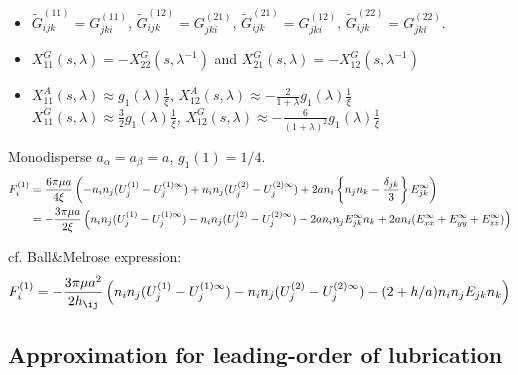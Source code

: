 \documentclass[11pt]{scrartcl}
\begin{document}
\begin{itemize}
 \item $\tilde{G}_{ijk}^{(11)}=G_{jki}^{(11)}$,
$\tilde{G}_{ijk}^{(12)}=G_{jki}^{(21)}$,
$\tilde{G}_{ijk}^{(21)}=G_{jki}^{(12)}$,
$\tilde{G}_{ijk}^{(22)}=G_{jki}^{(22)}$.

 \item 
$X_{11}^{G}(s,\lambda)
= - X_{22}^{G} (s, \lambda^{-1})$
and $X_{21}^{G}(s,\lambda)
= - X_{12}^{G} (s, \lambda^{-1})$

 \item 
$X_{11}^{A}(s,\lambda)\approx g_1(\lambda) \frac{1}{\xi}$, 
$X_{12}^{A}(s,\lambda) \approx -\frac{2}{1+\lambda}g_1(\lambda) \frac{1}{\xi}$\\
$X_{11}^{G}(s,\lambda)\approx \frac{3}{2} g_1(\lambda) \frac{1}{\xi}$,
$X_{12}^{G}(s,\lambda)\approx -\frac{6}{(1+\lambda)^2} g_1(\lambda) \frac{1}{\xi}$   
\end{itemize}
Monodisperse $a_\alpha = a_{\beta}=a$, $g_1(1)=1/4$.
\begin{align}
 F^{(1)}_i
&= 
\frac{6 \pi\mu a}{4\xi}
\left(
-   n_i n_j
(U_{j}^{(1)}-U_{j}^{(1)\infty})
+   n_i n_j
(U_{j}^{(2)}-U_{j}^{(2)\infty})
+  
2a n_i\left\{n_j n_k - \frac{\delta_{jk}}{3} \right\} E^{\infty}_{jk}
\right) \notag \\
&= 
-
\frac{3 \pi\mu a}{2\xi}
\left(
   n_i n_j
(U_{j}^{(1)}-U_{j}^{(1)\infty})
-   n_i n_j
(U_{j}^{(2)}-U_{j}^{(2)\infty})
-  
2a n_in_j  E^{\infty}_{jk}n_k
+2an_i(E^{\infty}_{xx}+E^{\infty}_{yy}+E^{\infty}_{zz} )
\right)
\end{align}

cf. Ball\&Melrose expression:
\begin{equation}
F_i^{(1)}
=
- 
\frac{3 \pi \mu a^2}{2 h_{\ij}}
\left(
n_{i} n_j (U^{(1)}_j-U^{(1)\infty}_j)
- n_{i} n_j (U^{(2)}_j-U^{(2)\infty}_j)
- (2+h/a) n_i n_j  E_{jk}n_k
\right) 
 \end{equation}

\subsection{Approximation for leading-order of lubrication}
\end{document}
